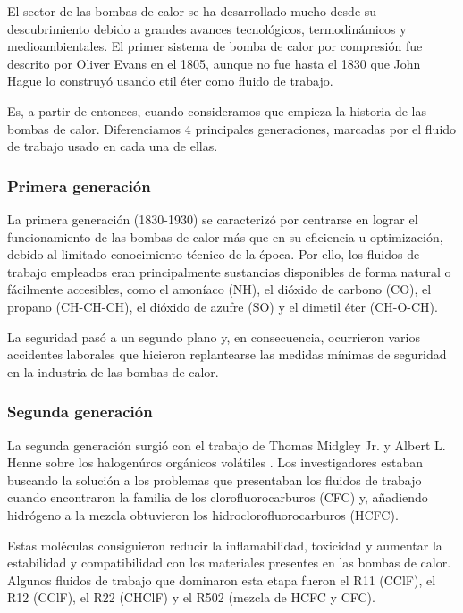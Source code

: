 \documentclass[../main.tex]{subfiles}
\begin{document}
El sector de las bombas de calor se ha desarrollado mucho desde su descubrimiento debido a grandes avances tecnológicos, termodinámicos y medioambientales. El primer sistema de bomba de calor por compresión fue descrito por Oliver Evans en el 1805, aunque no fue hasta el 1830 que John Hague lo construyó usando etil éter como fluido de trabajo.

Es, a partir de entonces, cuando consideramos que empieza la historia de las bombas de calor. Diferenciamos 4 principales generaciones, marcadas por el fluido de trabajo usado en cada una de ellas.

\subsubsection{Primera generación}
La primera generación (1830-1930) se caracterizó por centrarse en lograr el funcionamiento de las bombas de calor más que en su eficiencia u optimización, debido al limitado conocimiento técnico de la época. Por ello, los fluidos de trabajo empleados eran principalmente sustancias disponibles de forma natural o fácilmente accesibles, como el amoníaco (NH), el dióxido de carbono (CO), el propano (CH-CH-CH), el dióxido de azufre (SO) y el dimetil éter (CH-O-CH).


La seguridad pasó a un segundo plano y, en consecuencia, ocurrieron varios accidentes laborales que hicieron replantearse las medidas mínimas de seguridad en la industria de las bombas de calor.



\subsubsection{Segunda generación}
La segunda generación surgió con el trabajo de Thomas Midgley Jr. y Albert L. Henne sobre los halogenúros orgánicos volátiles \cite{midgley1930organic}. Los investigadores estaban buscando la solución a los problemas que presentaban los fluidos de trabajo cuando encontraron la familia de los clorofluorocarburos (CFC) y, añadiendo hidrógeno a la mezcla obtuvieron los hidroclorofluorocarburos (HCFC).

Estas moléculas consiguieron reducir la inflamabilidad, toxicidad y aumentar la estabilidad y compatibilidad con los materiales presentes en las bombas de calor. Algunos fluidos de trabajo que dominaron esta etapa fueron el R11 (CClF), el R12 (CClF), el R22 (CHClF) y el R502 (mezcla de HCFC y CFC).
\end{document}
